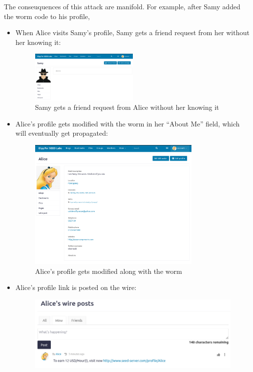 \documentclass[12pt]{article}
\begin{document}
The conseuquences of this attack are manifold. For example, after Samy added the worm code to his profile,
\begin{itemize}
 \item When Alice visits Samy's profile, Samy gets a friend request from her without her knowing it:
     \begin{figure}[H]
         \centering
         \includegraphics[width=0.5\textwidth]{Images/ss10.png}
         \caption{Samy gets a friend request from Alice without her knowing it}
         \label{fig:ss10}
     \end{figure}
 \item Alice's profile gets modified with the worm in her ``About Me'' field, which will eventually get propagated:
     \begin{figure}[H]
         \centering
         \includegraphics[width=0.8\textwidth]{Images/ss11.png}
         \caption{Alice's profile gets modified along with the worm}
         \label{fig:ss11}
     \end{figure}
 \item Alice's profile link is posted on the wire:
     \begin{figure}[H]
         \centering
         \includegraphics[width=\textwidth]{Images/ss12.png}

\end{figure}
\end{itemize}
\end{document}
